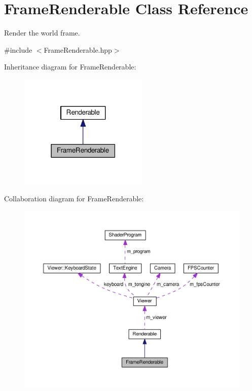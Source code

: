 \hypertarget{classFrameRenderable}{\section{Frame\+Renderable Class Reference}
\label{classFrameRenderable}
}


Render the world frame.  




{\ttfamily \#include $<$Frame\+Renderable.\+hpp$>$}



Inheritance diagram for Frame\+Renderable\+:\nopagebreak
\begin{figure}[H]
\begin{center}
\leavevmode
\includegraphics[width=174pt]{classFrameRenderable__inherit__graph}
\end{center}
\end{figure}


Collaboration diagram for Frame\+Renderable\+:\nopagebreak
\begin{figure}[H]
\begin{center}
\leavevmode
\includegraphics[width=350pt]{classFrameRenderable__coll__graph}
\end{center}
\end{figure}

